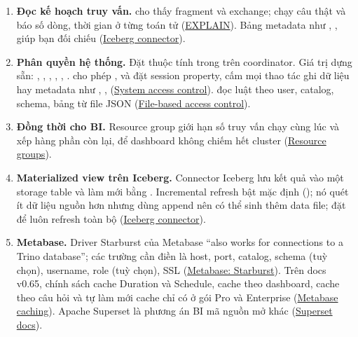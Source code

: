 \begin{enumerate}
  \item \textbf{Đọc kế hoạch truy vấn.}  cho thấy fragment và exchange;  chạy câu thật và báo số dòng, thời gian ở từng toán tử (\href{https://trino.io/docs/current/sql/explain.html}{EXPLAIN}). Bảng metadata như , ,  giúp bạn đối chiếu (\href{https://trino.io/docs/current/connector/iceberg.html}{Iceberg connector}).
  \item \textbf{Phân quyền hệ thống.} Đặt thuộc tính  trong  trên coordinator. Giá trị dựng sẵn: , , , , , .  cho phép ,  và đặt session property, cấm mọi thao tác ghi dữ liệu hay metadata như , ,  (\href{https://trino.io/docs/current/security/built-in-system-access-control.html}{System access control}).  đọc luật theo user, catalog, schema, bảng từ file JSON (\href{https://trino.io/docs/current/security/file-system-access-control.html}{File-based access control}).
  \item \textbf{Đồng thời cho BI.} Resource group giới hạn số truy vấn chạy cùng lúc và xếp hàng phần còn lại, để dashboard không chiếm hết cluster (\href{https://trino.io/docs/current/admin/resource-groups.html}{Resource groups}).
  \item \textbf{Materialized view trên Iceberg.} Connector Iceberg lưu kết quả vào một storage table và làm mới bằng . Incremental refresh bật mặc định (); nó quét ít dữ liệu nguồn hơn nhưng dùng append nên có thể sinh thêm data file; đặt  để luôn refresh toàn bộ (\href{https://trino.io/docs/current/connector/iceberg.html}{Iceberg connector}).
  \item \textbf{Metabase.} Driver Starburst của Metabase ``also works for connections to a Trino database''; các trường cần điền là host, port, catalog, schema (tuỳ chọn), username, role (tuỳ chọn), SSL (\href{https://www.metabase.com/docs/latest/databases/connections/starburst}{Metabase: Starburst}). Trên docs v0.65, chính sách cache Duration và Schedule, cache theo dashboard, cache theo câu hỏi và tự làm mới cache chỉ có ở gói Pro và Enterprise (\href{https://www.metabase.com/docs/latest/configuring-metabase/caching}{Metabase caching}). Apache Superset là phương án BI mã nguồn mở khác (\href{https://superset.apache.org/docs/intro/}{Superset docs}).

\end{enumerate}
